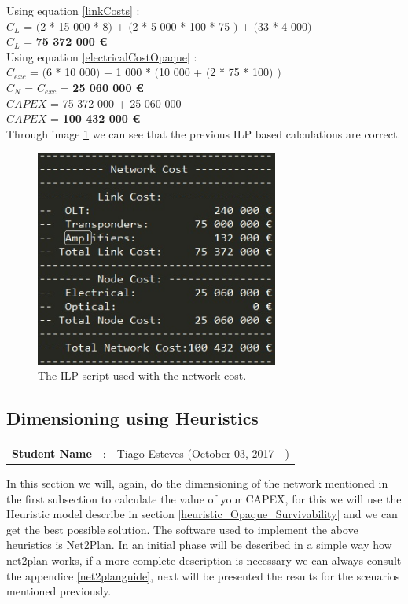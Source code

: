 Using equation \ref{linkCosts} : \\
$C_L$ = $($2 * 15 000 * 8$)$ + $($2 * 5 000 * 100 * 75 $)$ + $($33 * 4 000$)$ \\
$C_L$ = \textbf{ 75 372 000 \euro} \\

Using equation \ref{electricalCostOpaque} : \\
$C_{exc}$ = $($6 * 10 000$)$ + 1 000 * $($10 000 + $($2 * 75 * 100$)$ $)$ \\
$C_N$ = $C_{exc}$ = \textbf{25 060 000 \euro} \\

$CAPEX$ = 75 372 000 + 25 060 000 \\
$CAPEX$ = \textbf{100 432 000 \euro}\\

Through image \ref{scriptopaque_surv_ref_high} we can see that the previous ILP based calculations are correct.
\begin{figure}[h!]
\centering
\includegraphics[width=8cm]{sdf/opaque/figures/script_opaque_surv_ref_high}
\caption{The ILP script used with the network cost.}
\label{scriptopaque_surv_ref_high}
\end{figure}


\subsection{Dimensioning using Heuristics}
\begin{tcolorbox}	
\begin{tabular}{p{2.75cm} p{0.2cm} p{10.5cm}} 	
\textbf{Student Name}  &:& Tiago Esteves    (October 03, 2017 - )\\
\end{tabular}
\end{tcolorbox}

\vspace{11pt}
In this section we will, again, do the dimensioning of the network mentioned in the first subsection to calculate the value of your CAPEX, for this we will use the Heuristic model describe in section \ref{heuristic_Opaque_Survivability} and we can get the best possible solution.
The software used to implement the above heuristics is Net2Plan.
In an initial phase will be described in a simple way how net2plan works, if a more complete description is necessary we can always consult the appendice \ref{net2planguide}, next will be presented the results for the scenarios mentioned previously.

